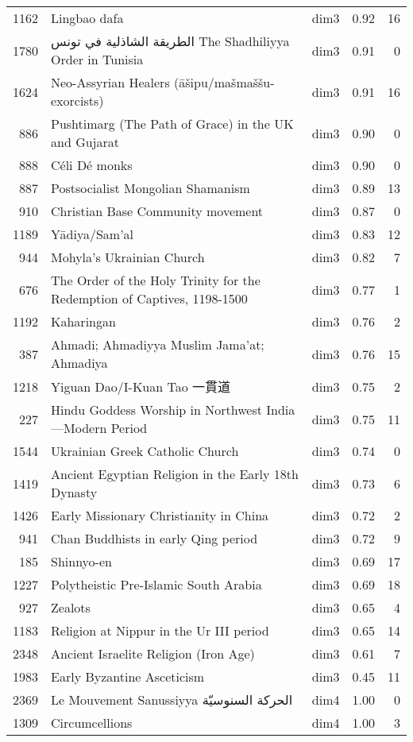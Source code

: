 \begin{tabular}{rllrr}
1162 & Lingbao dafa & dim3 & 0.92 & 16 \\
1780 & الطريقة الشاذلية في تونس The Shadhiliyya Order in Tunisia & dim3 & 0.91 & 0 \\
1624 & Neo-Assyrian Healers (āšipu/mašmaššu-exorcists) & dim3 & 0.91 & 16 \\
886 & Pushtimarg (The Path of Grace) in the UK and Gujarat & dim3 & 0.90 & 0 \\
888 & Céli Dé monks & dim3 & 0.90 & 0 \\
887 & Postsocialist Mongolian Shamanism & dim3 & 0.89 & 13 \\
910 & Christian Base Community movement & dim3 & 0.87 & 0 \\
1189 & Yādiya/Sam'al & dim3 & 0.83 & 12 \\
944 & Mohyla's Ukrainian Church & dim3 & 0.82 & 7 \\
676 & The Order of the Holy Trinity for the Redemption of Captives, 1198-1500 & dim3 & 0.77 & 1 \\
1192 & Kaharingan & dim3 & 0.76 & 2 \\
387 & Ahmadi; Ahmadiyya Muslim Jama'at; Ahmadiya & dim3 & 0.76 & 15 \\
1218 & Yiguan Dao/I-Kuan Tao 一貫道 & dim3 & 0.75 & 2 \\
227 & Hindu Goddess Worship in Northwest India—Modern Period & dim3 & 0.75 & 11 \\
1544 & Ukrainian Greek Catholic Church & dim3 & 0.74 & 0 \\
1419 & Ancient Egyptian Religion in the Early 18th Dynasty & dim3 & 0.73 & 6 \\
1426 & Early Missionary Christianity in China & dim3 & 0.72 & 2 \\
941 & Chan Buddhists in early Qing period & dim3 & 0.72 & 9 \\
185 & Shinnyo-en & dim3 & 0.69 & 17 \\
1227 & Polytheistic Pre-Islamic South Arabia & dim3 & 0.69 & 18 \\
927 & Zealots & dim3 & 0.65 & 4 \\
1183 & Religion at Nippur in the Ur III period & dim3 & 0.65 & 14 \\
2348 & Ancient Israelite Religion (Iron Age) & dim3 & 0.61 & 7 \\
1983 & Early Byzantine Asceticism & dim3 & 0.45 & 11 \\
2369 & Le Mouvement Sanussiyya الحركة السنوسيّة & dim4 & 1.00 & 0 \\
1309 & Circumcellions & dim4 & 1.00 & 3 \\

\end{tabular}
